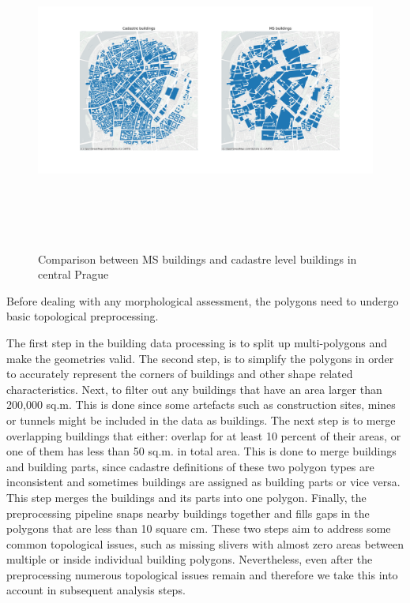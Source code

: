 \documentclass[
  letterpaper,
  DIV=11,
  numbers=noendperiod]{scrartcl}
\begin{document}
\begin{figure}[H]

{\centering \includegraphics[width=\linewidth,height=4.16667in,keepaspectratio]{../figures/algo_design/building_comparison.png}

}

\caption{Comparison between MS buildings and cadastre level buildings in
central Prague}

\end{figure}%

Before dealing with any morphological assessment, the polygons need to
undergo basic topological preprocessing.

The first step in the building data processing is to split up
multi-polygons and make the geometries valid. The second step, is to
simplify the polygons in order to accurately represent the corners of
buildings and other shape related characteristics. Next, to filter out
any buildings that have an area larger than 200,000 sq.m. This is done
since some artefacts such as construction sites, mines or tunnels might
be included in the data as buildings. The next step is to merge
overlapping buildings that either: overlap for at least 10 percent of
their areas, or one of them has less than 50 sq.m. in total area. This
is done to merge buildings and building parts, since cadastre
definitions of these two polygon types are inconsistent and sometimes
buildings are assigned as building parts or vice versa. This step merges
the buildings and its parts into one polygon. Finally, the preprocessing
pipeline snaps nearby buildings together and fills gaps in the polygons
that are less than 10 square cm. These two steps aim to address some
common topological issues, such as missing slivers with almost zero
areas between multiple or inside individual building polygons.
Nevertheless, even after the preprocessing numerous topological issues
remain and therefore we take this into account in subsequent analysis
steps.
\end{document}
